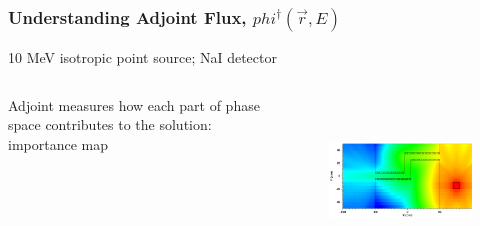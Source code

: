 \documentclass[xcolor=x11names,compress]{beamer}
\renewcommand{\(}{\begin{columns}}
\renewcommand{\)}{\end{columns}}
\newcommand{\<}[1]{\begin{column}{#1}}
\renewcommand{\>}{\end{column}}
\begin{document}
%
\begin{frame}[fragile]
  \frametitle{Understanding Adjoint Flux, $phi^{\dagger}(\vec{r},E)$}
  10 MeV isotropic point source; NaI detector
  \begin{columns}
   \begin{column}{0.25\textwidth}
   Adjoint measures how each part of phase space contributes to the solution: \\
\vspace*{.5em}
\alert{importance map} 
   \end{column}
  \begin{column}{0.75\textwidth}
   \begin{figure}
   \includegraphics[height=1.75in,clip]{../figs/maze-adjoint.png}
   \end{figure}
   \end{column}
\end{columns}
\end{frame}
\end{document}

